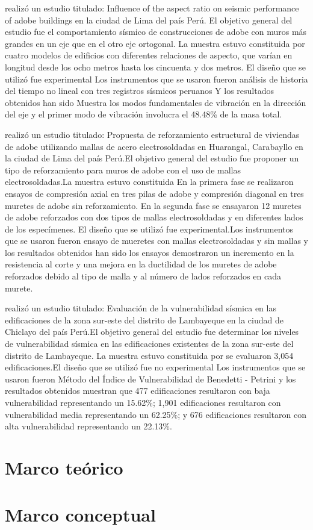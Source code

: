 \cite{OteroMonteza2022} realizó un estudio titulado: Influence of the aspect ratio on seismic performance of adobe buildings en la ciudad de Lima del país Perú. El objetivo general del estudio fue el comportamiento sísmico de construcciones de adobe con muros más grandes en un eje que en el otro eje ortogonal. La muestra estuvo constituida por cuatro modelos de edificios con diferentes relaciones de aspecto, que varían en longitud desde los ocho metros hasta los cincuenta y dos metros.  El diseño que se utilizó fue experimental Los instrumentos que se usaron fueron análisis de historia del tiempo no lineal con tres registros sísmicos peruanos Y los resultados obtenidos han sido Muestra los modos fundamentales de vibración en la dirección del eje y el primer modo de vibración involucra el 48.48\% de la masa total.

\cite{QuirozHuaraya2021} realizó un estudio titulado: Propuesta de reforzamiento estructural de viviendas de adobe utilizando mallas de acero electrosoldadas en Huarangal, Carabayllo en la ciudad de Lima del país Perú.El objetivo general del estudio fue proponer un tipo de reforzamiento para muros de adobe con el uso de mallas electrosoldadas.La muestra estuvo constituida En la primera fase se realizaron ensayos de compresión axial en tres pilas de adobe y compresión diagonal en tres muretes de adobe sin reforzamiento. En la segunda fase se ensayaron 12 muretes de adobe reforzados con dos tipos de mallas electrosoldadas y en diferentes lados de los especímenes. El diseño que se utilizó fue experimental.Los instrumentos que se usaron fueron ensayo de mueretes con mallas electrosoldadas y sin mallas y los resultados obtenidos han sido los ensayos demostraron un incremento en la resistencia al corte y una mejora en la ductilidad de los muretes de adobe reforzados debido al tipo de malla y al número de lados reforzados en cada murete.

\cite{CerveraTimana2023} realizó un estudio titulado: Evaluación de la vulnerabilidad sísmica en las edificaciones de la zona sur-este del distrito de Lambayeque en la ciudad de Chiclayo del país Perú.El objetivo general del estudio fue determinar los niveles de vulnerabilidad sísmica en las edificaciones existentes de la zona sur-este del distrito de Lambayeque. La muestra estuvo constituida por se evaluaron 3,054 edificaciones.El diseño que se utilizó fue no experimental Los instrumentos que se usaron fueron Método del Índice de Vulnerabilidad de Benedetti - Petrini y los resultados obtenidos muestran que 477 edificaciones resultaron con baja vulnerabilidad representando un 15.62\%; 1,901 edificaciones resultaron con vulnerabilidad media representando un 62.25\%; y 676 edificaciones resultaron con alta vulnerabilidad representando un 22.13\%.

\section{Marco teórico}

\cite{CENEPRED2014}

\section{Marco conceptual}
